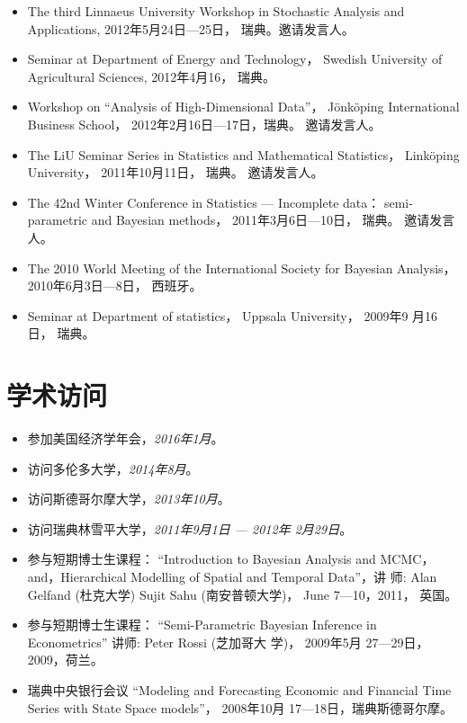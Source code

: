 \documentclass[twoside,a4paper,10pt]{amsart}
\begin{document}
\begin{itemize}
\item The third Linnaeus University Workshop in Stochastic Analysis and
  Applications, 2012年5月24日---25日， 瑞典。邀请发言人。

\item Seminar at Department of Energy and Technology， Swedish
  University of Agricultural Sciences, 2012年4月16， 瑞典。

\item Workshop on ``Analysis of High-Dimensional Data''，
  Jönköping International Business School， 2012年2月16日---17日，瑞典。
  邀请发言人。

\item The LiU Seminar Series in Statistics and Mathematical Statistics，
  Linköping University， 2011年10月11日， 瑞典。 邀请发言人。

\item The 42nd Winter Conference in Statistics --- Incomplete data：
  semi-parametric and Bayesian methods， 2011年3月6日---10日，
  瑞典。 邀请发言人。

\item The 2010 World Meeting of the International Society for Bayesian
  Analysis， 2010年6月3日---8日， 西班牙。

\item Seminar at Department of statistics， Uppsala University， 2009年9
  月16日， 瑞典。

\end{itemize}


\section*{学术访问}

\begin{itemize}
\item 参加美国经济学年会，\emph{2016年1月}。
\item 访问多伦多大学，\emph{2014年8月}。
\item 访问斯德哥尔摩大学，\emph{2013年10月}。

\item 访问瑞典林雪平大学，\emph{2011年9月1日 --- 2012年 2月29日}。

\item 参与短期博士生课程： ``Introduction to Bayesian Analysis and
  MCMC， and，Hierarchical Modelling of Spatial and Temporal Data''，讲
  师: Alan Gelfand (杜克大学) Sujit Sahu (南安普顿大学)， June
  7---10，2011， 英国。

\item 参与短期博士生课程： ``Semi-Parametric Bayesian Inference in
  Econometrics'' 讲师: Peter Rossi (芝加哥大
  学)， 2009年5月 27---29日，2009，荷兰。

\item 瑞典中央银行会议 ``Modeling and Forecasting Economic and
  Financial Time Series with State Space
  models''， 2008年10月 17---18日，瑞典斯德哥尔摩。
\end{itemize}
\end{document}
